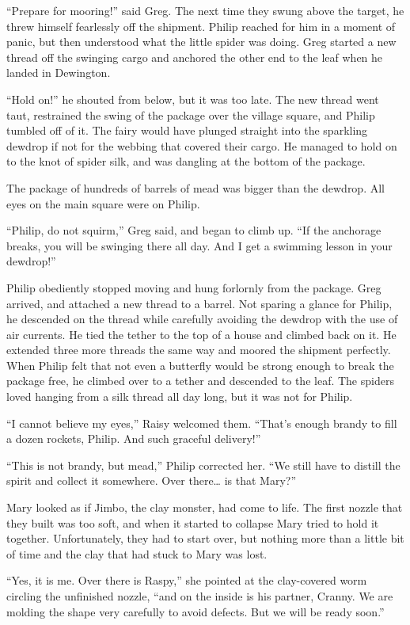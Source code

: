 \documentclass[10pt, draft]{memoir}
\begin{document}
``Prepare for mooring!'' said Greg. The next time they swung above the target, he threw himself fearlessly off the shipment. Philip reached for him in a moment of panic, but then understood what the little spider was doing. Greg started a new thread off the swinging cargo and anchored the other end to the leaf when he landed in Dewington.

``Hold on!'' he shouted from below, but it was too late. The new thread went taut, restrained the swing of the package over the village square, and Philip tumbled off of it. The fairy would have plunged straight into the sparkling dewdrop if not for the webbing that covered their cargo. He managed to hold on to the knot of spider silk, and was dangling at the bottom of the package.

The package of hundreds of barrels of mead was bigger than the dewdrop. All eyes on the main square were on Philip.

``Philip, do not squirm,'' Greg said, and began to climb up. ``If the anchorage breaks, you will be swinging there all day. And I get a swimming lesson in your dewdrop!''

Philip obediently stopped moving and hung forlornly from the package. Greg arrived, and attached a new thread to a barrel. Not sparing a glance for Philip, he descended on the thread while carefully avoiding the dewdrop with the use of air currents. He tied the tether to the top of a house and climbed back on it. He extended three more threads the same way and moored the shipment perfectly. When Philip felt that not even a butterfly would be strong enough to break the package free, he climbed over to a tether and descended to the leaf. The spiders loved hanging from a silk thread all day long, but it was not for Philip.

``I cannot believe my eyes,'' Raisy welcomed them. ``That's enough brandy to fill a dozen rockets, Philip. And such graceful delivery!''

``This is not brandy, but mead,'' Philip corrected her. ``We still have to distill the spirit and collect it somewhere. Over there… is that Mary?''

Mary looked as if Jimbo, the clay monster, had come to life. The first nozzle that they built was too soft, and when it started to collapse Mary tried to hold it together. Unfortunately, they had to start over, but nothing more than a little bit of time and the clay that had stuck to Mary was lost.

``Yes, it is me. Over there is Raspy,'' she pointed at the clay-covered worm circling the unfinished nozzle, ``and on the inside is his partner, Cranny. We are molding the shape very carefully to avoid defects. But we will be ready soon.''
\end{document}
